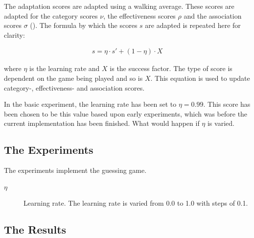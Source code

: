 The adaptation scores are adapted using a walking average. These scores are adapted for the category scores $\nu$, the effectiveness scores $\rho$ and the association scores $\sigma$ (). The formula by which the scores $s$ are adapted is repeated here for clarity:

\begin{eqnarray}
s = \eta \cdot s' + (1-\eta)\cdot X
\end{eqnarray}


where $\eta$ is the learning rate and $X$ is the success factor. The type of score is dependent on the game being played and so is $X$. This equation is used to update category-, effectiveness- and association scores.

In the basic experiment, the learning rate has been set to $\eta=0.99$. This score has been chosen to be this value based upon early experiments, which was before the current implementation has been finished. What would happen if $\eta$ is varied.

\subsection{The Experiments}

The experiments implement the guessing game.

\begin{description}
\item[$\eta$] Learning rate. The learning rate is varied from 0.0 to 1.0 with steps of 0.1.
\end{description}

\subsection{The Results}

